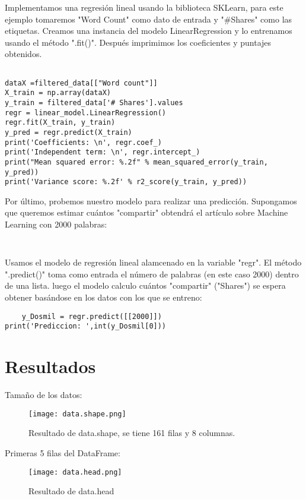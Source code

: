 \documentclass{pssbmac}
\begin{document}
Implementamos una regresión lineal usando la biblioteca SKLearn, para este ejemplo tomaremos "Word Count" como dato de entrada y "\#Shares" como las etiquetas. 
Creamos una instancia del modelo LinearRegression y lo entrenamos usando el método ".fit()". Después imprimimos los coeficientes y puntajes obtenidos.
\begin{lstlisting}

dataX =filtered_data[["Word count"]]
X_train = np.array(dataX)
y_train = filtered_data['# Shares'].values
regr = linear_model.LinearRegression()
regr.fit(X_train, y_train)
y_pred = regr.predict(X_train)
print('Coefficients: \n', regr.coef_)
print('Independent term: \n', regr.intercept_)
print("Mean squared error: %.2f" % mean_squared_error(y_train, y_pred))
print('Variance score: %.2f' % r2_score(y_train, y_pred))
\end{lstlisting}
Por último, probemos nuestro modelo para realizar una predicción. 
Supongamos que queremos estimar cuántos "compartir" obtendrá el artículo sobre Machine Learning con 2000 palabras:
\begin{lstlisting}
    
\end{lstlisting}
Usamos el modelo de regresión lineal alamcenado en la variable "regr". El método ".predict()" toma como entrada el número de palabras (en este caso 2000) dentro de una lista. luego el modelo calculo cuántos "compartir" ("Shares") se espera obtener basándose en los datos con los que se entreno:
\begin{lstlisting}
    y_Dosmil = regr.predict([[2000]])
print('Prediccion: ',int(y_Dosmil[0]))
\end{lstlisting}

\section{Resultados}

Tamaño de los datos: 

\begin{figure}[H]
\centering
\texttt{[image: data.shape.png]}
\caption{ {\small Resultado de data.shape, se tiene 161 filas y 8 columnas.}}
\label{figura01}
\end{figure}

Primeras 5 filas del DataFrame:

\begin{figure}[H]
\centering
\texttt{[image: data.head.png]}
\caption{ {\small Resultado de data.head}}
\label{figura02}
\end{figure}
\end{document}
